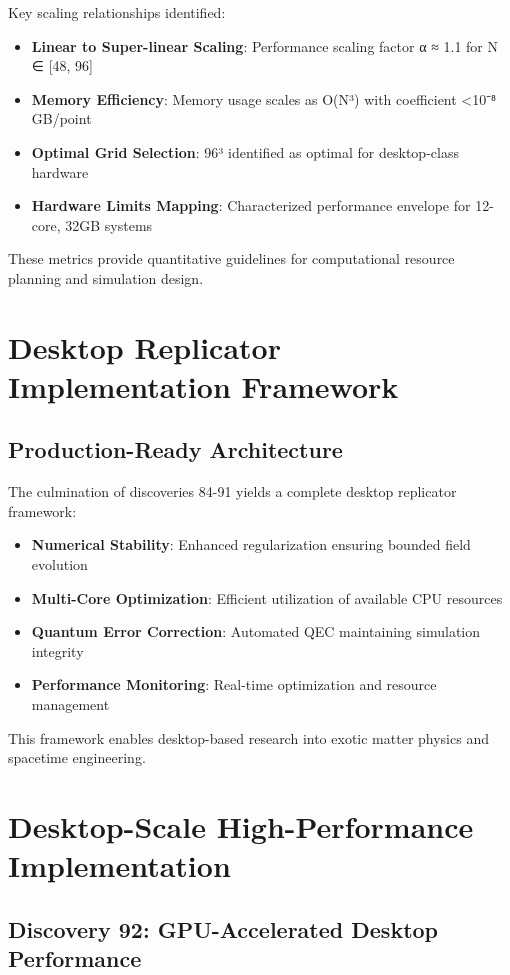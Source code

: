 \documentclass[11pt]{article}
\begin{document}
Key scaling relationships identified:
\begin{itemize}
\item \textbf{Linear to Super-linear Scaling}: Performance scaling factor α ≈ 1.1 for N ∈ [48, 96]
\item \textbf{Memory Efficiency}: Memory usage scales as O(N³) with coefficient <10⁻⁸ GB/point
\item \textbf{Optimal Grid Selection}: 96³ identified as optimal for desktop-class hardware
\item \textbf{Hardware Limits Mapping}: Characterized performance envelope for 12-core, 32GB systems
\end{itemize}

These metrics provide quantitative guidelines for computational resource planning and simulation design.

\section{Desktop Replicator Implementation Framework}

\subsection{Production-Ready Architecture}

The culmination of discoveries 84-91 yields a complete desktop replicator framework:
\begin{itemize}
\item \textbf{Numerical Stability}: Enhanced regularization ensuring bounded field evolution
\item \textbf{Multi-Core Optimization}: Efficient utilization of available CPU resources
\item \textbf{Quantum Error Correction}: Automated QEC maintaining simulation integrity
\item \textbf{Performance Monitoring}: Real-time optimization and resource management
\end{itemize}

This framework enables desktop-based research into exotic matter physics and spacetime engineering.

\section{Desktop-Scale High-Performance Implementation}

\subsection{Discovery 92: GPU-Accelerated Desktop Performance}
\end{document}
